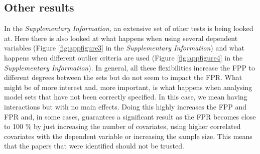 \subsection{Other results}
In the \textit{Supplementary Information}, an extensive set of other tests is being looked at. Here there is also looked at what happens when using several dependent variables (Figure \ref{fig:appfigure3} in the \textit{Supplementary Information}) and what happens when different outlier criteria are used (Figure \ref{fig:appfigure4} in the \textit{Supplementary Information}). In general, all these flexibilities increase the FPP to different degrees between the sets but do not seem to impact the FPR. What might be of more interest and, more important, is what happens when analysing model sets that have not been correctly specified. In this case, we mean having interactions but with no main effects. Doing this highly increases the FPP and FPR and, in some cases, guarantees a significant result as the FPR becomes close to 100 \% by just increasing the number of covariates, using higher correlated covariates with the dependent variable or increasing the sample size. This means that the papers that were identified should not be trusted.
